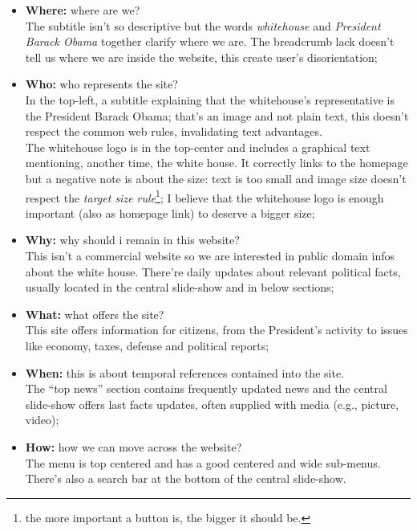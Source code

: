 \documentclass[
10pt, %
a4paper, %
oneside, %
headinclude,footinclude, %
BCOR5mm, %
]{scrartcl}
\begin{document}
\begin{itemize}%
	\item \textbf{Where:} where are we? \\ The subtitle isn't so descriptive but the words \emph{whitehouse} and \emph{President Barack Obama} together clarify where we are. The breadcrumb lack doesn't tell us where we are inside the website, this create user's disorientation;

	\item \textbf{Who:} who represents the site? \\ In the top-left, a subtitle explaining that the whitehouse's representative is the President Barack Obama; that's an image and not plain text, this doesn't respect the common web rules, invalidating text advantages. \\
	The whitehouse logo is in the top-center and includes a graphical text mentioning, another time, the white house. It correctly links to the homepage but a negative note is about the size: text is too small and image size doesn't respect the \emph{target size rule}\footnote{the more important a button is, the bigger it should be.}; I believe that the whitehouse logo is enough important (also as homepage link) to deserve a bigger size;

	\item \textbf{Why:} why should i remain in this website? \\ This isn't a commercial website so we are interested in public domain infos about the white house. There're daily updates about relevant political facts, usually located in the central slide-show and in below sections;

	\newpage
	\item \textbf{What:} what offers the site? \\ This site offers information for citizens, from the President's activity to issues like economy, taxes, defense and political reports;

	\item \textbf{When:} this is about temporal references contained into the site. \\ The ``top news'' section contains frequently updated news and the central slide-show offers last facts updates, often supplied with media (e.g., picture, video); 

	\item \textbf{How:} how we can move across the website? \\ The menu is top centered and has a good centered and wide sub-menus. There's also a search bar at the bottom of the central slide-show.

\end{itemize}
\end{document}
